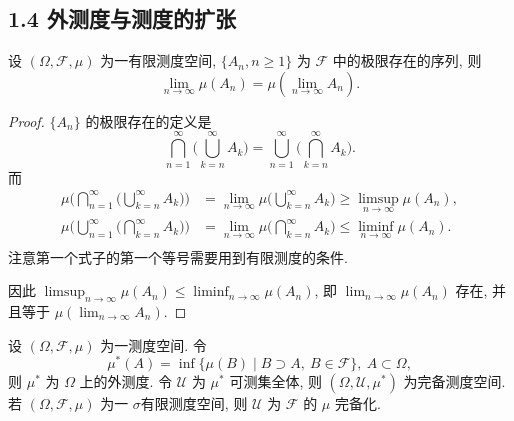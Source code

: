     \subsection{1.4 外测度与测度的扩张}
        \begin{3}
            设 $(\Omega,\mathcal{F},\mu)$ 为一有限测度空间, 
            $\{A_n,n\geqslant1\}$ 为 $\mathcal{F}$ 中的极限存在的序列, 
            则
            \[
                \lim_{n\to\infty}\mu(A_n)=\mu(\lim_{n\to\infty}A_n).
            \]
        \end{3}
        \begin{proof}
            $\{A_n\}$ 的极限存在的定义是
            \[
                \bigcap_{n=1}^\infty\big(\bigcup_{k=n}^\infty A_k\big)=\bigcup_{n=1}^\infty\big(\bigcap_{k=n}^\infty A_k\big).
            \]
            而
            \[
            \begin{aligned}
                \mu\big(\bigcap_{n=1}^\infty\big(\bigcup_{k=n}^\infty A_k\big)\big)&=\lim_{n\to\infty}\mu\big(\bigcup_{k=n}^\infty A_k\big)\geqslant \limsup_{n\to\infty}\mu(A_n),\\
                \mu\big(\bigcup_{n=1}^\infty\big(\bigcap_{k=n}^\infty A_k\big)\big)&=\lim_{n\to\infty}\mu\big(\bigcap_{k=n}^\infty A_k\big)\leqslant \liminf_{n\to\infty}\mu(A_n).\\
            \end{aligned}
            \]
            注意第一个式子的第一个等号需要用到有限测度的条件.
            
            因此 $\displaystyle\limsup_{n\to\infty}\mu(A_n)\le\liminf_{n\to\infty}\mu(A_n)$, 即 $\displaystyle\lim_{n\to\infty}\mu(A_n)$ 存在, 并且等于 $\displaystyle\mu(\lim_{n\to\infty}A_n).$
        \end{proof}
        \begin{4}
            设 $(\Omega,\mathcal{F},\mu)$ 为一测度空间. 令
            \[
                \mu^*(A)=\inf\{\mu(B)\mid B\supset A,\ B\in\mathcal{F}\},\ A\subset\Omega,
            \]
            则 $\mu^*$ 为 $\Omega$ 上的外测度. 令 $\mathcal{U}$ 为 $\mu^*$ 可测集全体, 则 $(\Omega,\mathcal{U},\mu^*)$ 为完备测度空间. 
            若 $(\Omega,\mathcal{F},\mu)$ 为一 $\sigma$有限测度空间, 则 $\mathcal{U}$ 为 $\mathcal{F}$ 的 $\mu$ 完备化.
        \end{4}
